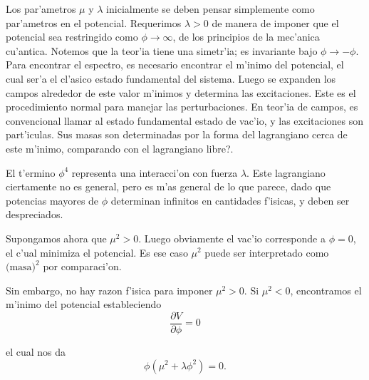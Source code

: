Los par'ametros $\mu$ y $\lambda$
  inicialmente se deben pensar simplemente como par'ametros en el potencial. Requerimos $\lambda>0$
  de manera de imponer que el potencial sea restringido como $\phi\rightarrow\infty$,
  de los principios de la mec'anica cu'antica. Notemos que la teor'ia tiene una simetr'ia; es invariante bajo $\phi\rightarrow-\phi$.
  Para encontrar el espectro, es necesario encontrar el m'inimo del potencial, el cual ser'a el cl'asico estado fundamental del sistema. Luego se expanden los campos alrededor de este valor m'inimos y determina las excitaciones. Este es el procedimiento normal para manejar las perturbaciones. En teor'ia de campos, es convencional llamar al estado fundamental estado de vac'io, y las excitaciones son part'iculas. Sus masas son determinadas por la forma del lagrangiano cerca de este m'inimo, comparando con el lagrangiano libre?.

El t'ermino $\phi^{4}$
  representa una interacci'on con fuerza $\lambda$.
  Este lagrangiano ciertamente no es general, pero es m'as general de lo que parece, dado que potencias mayores de $\phi$
  determinan infinitos en cantidades f'isicas, y deben ser despreciados.

Supongamos ahora que $\mu^{2}>0$. Luego obviamente el vac'io corresponde a $\phi=0$,
  el c'ual minimiza el potencial. Es ese caso $\mu^{2}$
  puede ser interpretado como $\text{(masa)}^{2}$
  por comparaci'on.

Sin embargo, no hay razon f'isica para imponer $\mu^{2}>0$.
  Si $\mu^{2}<0$,
  encontramos el m'inimo del potencial estableciendo 
\begin{equation}  
  \frac{\partial V}{\partial\phi}=0
 \end{equation}

el cual nos da
\begin{equation}
\phi(\mu^{2}+\lambda\phi^{2})=0.
\end{equation}
 

